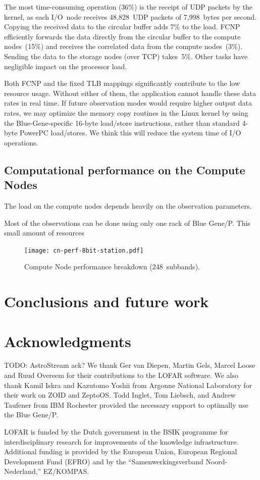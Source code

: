 \documentclass[conference]{IEEEtran}
\begin{document}
The most time-consuming operation (36\%) is the receipt of UDP packets by
the kernel, as each I/O~node receives 48,828~UDP packets of 7,998~bytes
per second.
Copying the received data to the circular buffer adds 7\% to the load.
FCNP efficiently forwards the data directly from the circular buffer to the
compute nodes~(15\%) and receives the correlated data from the compute
nodes~(3\%).
Sending the data to the storage nodes (over TCP) takes~5\%.
Other tasks have negligible impact on the processor load.

Both FCNP and the fixed TLB mappings significantly contribute to the low
resource usage.
Without either of them, the application cannot handle these data rates in
real time.
If future observation modes would require higher output data rates, we may
optimize the memory copy routines in the Linux kernel by using the
Blue-Gene-specific 16-byte load/store instructions, rather
than standard 4-byte PowerPC load/stores.
We think this will reduce the system time of I/O operations.


\subsection{Computational performance on the Compute Nodes}

The load on the compute nodes depends heavily on the observation parameters.

Most of the observations can be done using only one rack of Blue Gene/P.
This small amount of resources 

\begin{figure}
\texttt{[image: cn-perf-8bit-station.pdf]}
\caption{Compute Node performance breakdown (248~subbands).}
\label{fig:ionode-load}
\end{figure}

\section{Conclusions and future work}





\section*{Acknowledgments}

TODO: AstroStream ack?
We thank Ger van Diepen, Martin Gels, Marcel Loose and Ruud Overeem
for their contributions to the LOFAR software.
We also thank Kamil Iskra and Kazutomo Yoshii from Argonne National Laboratory
for their work on ZOID and ZeptoOS.
Todd Inglet, Tom Liebsch, and Andrew Taufener from IBM Rochester provided the
necessary support to optimally use the Blue Gene/P.

LOFAR is funded by the Dutch government in the BSIK programme for
interdisciplinary research for improvements of the knowledge infrastructure.
Additional funding is provided by the European Union, European Regional
Development Fund (EFRO) and by the ``Samenwerkingsverband Noord-Nederland,''
EZ/KOMPAS.



\end{document}
